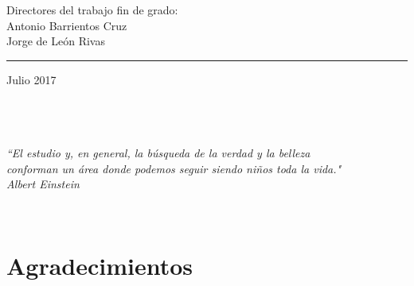 \documentclass[11pt,a4paper,twoside,openright]{report}
\begin{document}
\begin{titlepage}
\begin{center}
\vspace*{2.5mm}

\begin{large}
Directores del trabajo fin de grado: \\
\vspace*{5mm}
Antonio Barrientos Cruz \\
Jorge de León Rivas
\end{large}

\vspace*{2.5mm}

\rule{\textwidth}{0.1mm}

\vspace*{5mm}

Julio 2017

\end{center}

\end{titlepage}


\newpage
$\ $
\thispagestyle{empty} %


\chapter*{}
\begin{flushright}
\textit{``El estudio y, en general, la búsqueda de la verdad y la belleza \\
conforman un área donde podemos seguir siendo niños toda la vida."\\
Albert Einstein}
\end{flushright}

\newpage
$\ $
\thispagestyle{empty} %


\chapter*{Agradecimientos} %
 
\end{document}
